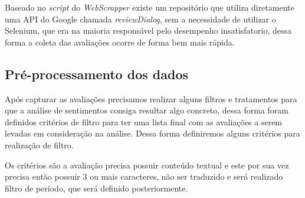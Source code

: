 Baseado no \emph{script} do \emph{WebScrapper} existe um repositório que utiliza diretamente uma API do Google chamada \emph{reviewDialog}, sem a necessidade de utilizar o Selenium, que era na maioria responsável pelo desempenho insatisfatorio, dessa forma a coleta das avaliações ocorre de forma bem mais rápida.


\subsection{Pré-processamento dos dados}
\label{cap:metodologia:sec:conjunto_dados:sec:pre_processamento}

Após capturar as avaliações precisamos realizar alguns filtros e tratamentos para que a análise de sentimentos consiga resultar algo concreto, dessa forma foram definidos critérios de filtro para ter uma lista final com as avaliações a serem levadas em consideração na análise. Dessa forma definiremos alguns critérios para realização de filtro.

Os critérios são a avaliação precisa possuir conteúdo textual e este por sua vez precisa então possuir 3 ou mais caracteres, não ser traduzido e será realizado filtro de período, que será definido posteriormente.

